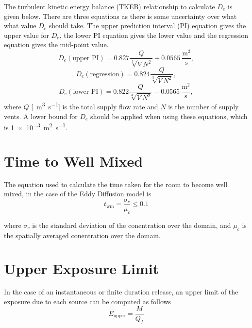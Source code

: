 \documentclass[]{article}
\begin{document}
The turbulent kinetic energy balance (TKEB) relationship to calculate $D_e$ is
given below. There are three equations as there is some uncertainty over what
what value $D_e$ should take. The upper prediction interval (PI) equation gives
the upper value for $D_e$, the lower PI equation gives the lower value and the
regression equation gives the mid-point value. 
\begin{equation}\label{eq:karlUpper}
	D_e(\text{upper PI}) = 0.827 \frac{Q}{\sqrt[3]{V\:N^2}} + 0.0565\:\frac{\text{m}^2}{\text{s}},
\end{equation}
\begin{equation}\label{eq:karlRegression}
	D_e(\text{regression}) = 0.824 \frac{Q}{\sqrt[3]{V\:N^2}},
\end{equation}
\begin{equation}\label{eq:karlLower}
	D_e(\text{lower PI}) = 0.822 \frac{Q}{\sqrt[3]{V\:N^2}} - 0.0565\:\frac{\text{m}^2}{\text{s}},
\end{equation}
where $Q$ [\SI{}{\meter\cubed\per\second}] is the total supply flow rate and $N$
is the number of supply vents. A lower bound for $D_e$ should be applied when
using these equations, which is \SI{1e-3}{\meter\squared\per\second}. 

\section{Time to Well Mixed}\label{app:timetowellmixed}
The equation used to calculate the time taken for the room to become well mixed,
in the case of the Eddy Diffusion model is \cite{drescher95}
\begin{equation}
    t_{\text{wm}}=\frac{\sigma_{c}}{\mu_{c}} \leq 0.1
\end{equation}

\noindent where $\sigma_{c}$ is the standard deviation of the conentration over
the domain, and $\mu_{c}$ is the spatially averaged conentration over the
domain.

\section{Upper Exposure Limit}\label{app:upperexpolimit}
In the case of an instantaneous or finite duration release, an upper limit of
the exposure due to each source can be computed as follows \cite{parker16}
\begin{equation}
    E_{\text{upper}} = \frac{M}{Q_{f}}
\end{equation}
\end{document}
